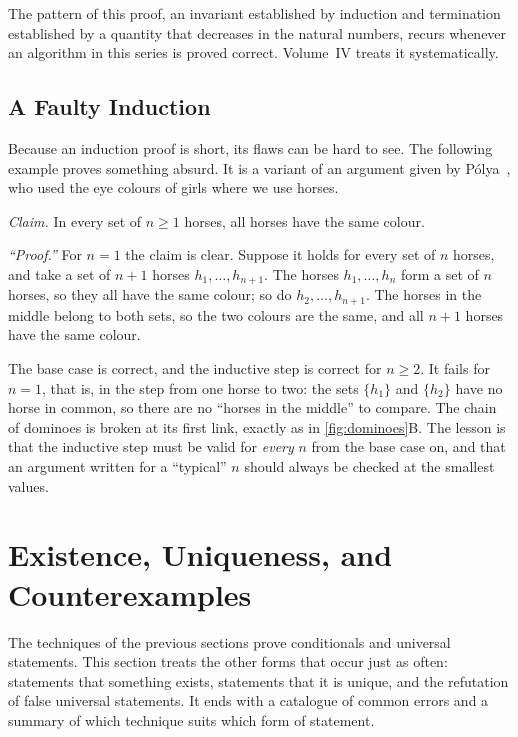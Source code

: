 The pattern of this proof, an invariant established by induction and termination established by a quantity that decreases in the natural numbers, recurs whenever an algorithm in this series is proved correct. Volume~IV treats it systematically.

\subsection{A Faulty Induction}

Because an induction proof is short, its flaws can be hard to see. The following example proves something absurd. It is a variant of an argument given by P\'olya~\cite[p.~120]{polya1954induction}, who used the eye colours of girls where we use horses.

\emph{Claim.} In every set of $n\ge1$ horses, all horses have the same colour.

\emph{``Proof.''} For $n=1$ the claim is clear. Suppose it holds for every set of $n$ horses, and take a set of $n+1$ horses $h_1,\ldots,h_{n+1}$. The horses $h_1,\ldots,h_n$ form a set of $n$ horses, so they all have the same colour; so do $h_2,\ldots,h_{n+1}$. The horses in the middle belong to both sets, so the two colours are the same, and all $n+1$ horses have the same colour.

The base case is correct, and the inductive step is correct for $n\ge2$. It fails for $n=1$, that is, in the step from one horse to two: the sets $\{h_1\}$ and $\{h_2\}$ have no horse in common, so there are no ``horses in the middle'' to compare. The chain of dominoes is broken at its first link, exactly as in \cref{fig:dominoes}B. The lesson is that the inductive step must be valid for \emph{every} $n$ from the base case on, and that an argument written for a ``typical'' $n$ should always be checked at the smallest values.

\section{Existence, Uniqueness, and Counterexamples}
\label{sec:existence}

The techniques of the previous sections prove conditionals and universal statements. This section treats the other forms that occur just as often: statements that something exists, statements that it is unique, and the refutation of false universal statements. It ends with a catalogue of common errors and a summary of which technique suits which form of statement.

